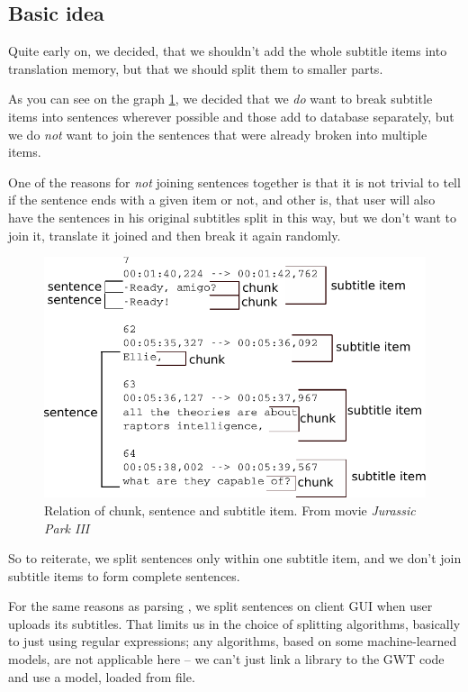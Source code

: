 \subsection*{Basic idea}
Quite early on, we decided, that we shouldn't add the whole subtitle items into translation memory, but that we should split them to smaller parts.

As you can see on the graph \ref{splitting:chunks}, we decided that we \emph{do} want to break subtitle items into sentences wherever possible and those add to database separately, but we do \emph{not} want to join the sentences that were already broken into multiple items.

One of the reasons for \emph{not} joining sentences together is that it is not trivial to tell if the sentence ends with a given item or not, and other is, that user will also have the sentences in his original subtitles split in this way, but we don't want to join it, translate it joined and then break it again randomly.

\begin{figure}[h]
\begin{center}
\includegraphics{figures/chunks.pdf}
\end{center}
\caption{Relation of chunk, sentence and subtitle item. From movie \emph{Jurassic Park III}}\label{splitting:chunks}
\end{figure}

So to reiterate, we split sentences only within one subtitle item, and we don't join subtitle items to form complete sentences.

For the same reasons as parsing , we split sentences on client GUI when user uploads its subtitles. That limits us in the choice of splitting algorithms, basically to just using regular expressions; any algorithms, based on some machine-learned models, are not applicable here -- we can't just link a library to the GWT code and use a model, loaded from file.

